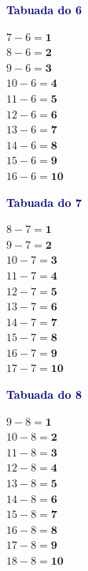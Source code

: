 \documentclass[12pt]{article}
\begin{document}
\vspace{10pt}\noindent
\begin{minipage}[t]{3.3cm}
\noindent\textcolor{darkblue}{\bfseries\small Tabuada do 6}\par\vspace{2pt}
{\footnotesize
$7-6=\mathbf{1}$\\$8-6=\mathbf{2}$\\$9-6=\mathbf{3}$\\
$10-6=\mathbf{4}$\\$11-6=\mathbf{5}$\\$12-6=\mathbf{6}$\\
$13-6=\mathbf{7}$\\$14-6=\mathbf{8}$\\$15-6=\mathbf{9}$\\
$16-6=\mathbf{10}$}
\end{minipage}\hfill
\begin{minipage}[t]{3.3cm}
\noindent\textcolor{darkblue}{\bfseries\small Tabuada do 7}\par\vspace{2pt}
{\footnotesize
$8-7=\mathbf{1}$\\$9-7=\mathbf{2}$\\$10-7=\mathbf{3}$\\
$11-7=\mathbf{4}$\\$12-7=\mathbf{5}$\\$13-7=\mathbf{6}$\\
$14-7=\mathbf{7}$\\$15-7=\mathbf{8}$\\$16-7=\mathbf{9}$\\
$17-7=\mathbf{10}$}
\end{minipage}\hfill
\begin{minipage}[t]{3.3cm}
\noindent\textcolor{darkblue}{\bfseries\small Tabuada do 8}\par\vspace{2pt}
{\footnotesize
$9-8=\mathbf{1}$\\$10-8=\mathbf{2}$\\$11-8=\mathbf{3}$\\
$12-8=\mathbf{4}$\\$13-8=\mathbf{5}$\\$14-8=\mathbf{6}$\\
$15-8=\mathbf{7}$\\$16-8=\mathbf{8}$\\$17-8=\mathbf{9}$\\
$18-8=\mathbf{10}$}
\end{minipage}\hfill
\end{document}
